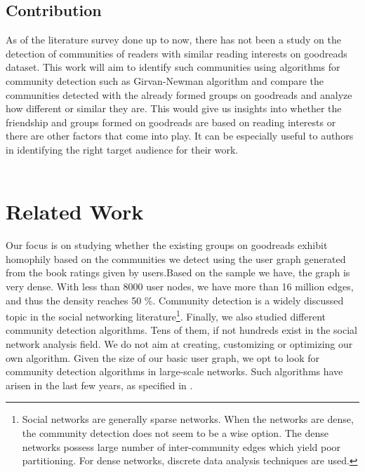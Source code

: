 \documentclass[11pt]{article}
\begin{document}
\subsection{Contribution}
As of the literature survey done up to now, there has not been a study on the detection of communities of readers with similar reading interests on goodreads dataset.
This work will aim to identify such communities using algorithms for community detection such as Girvan-Newman algorithm and compare the communities detected with the already formed groups on goodreads and analyze how different or similar they are.
This would give us insights into whether the friendship and groups formed on goodreads are based on reading interests or there are other factors that come into play. It can be especially useful to authors in identifying the right target audience for their work. \\\\

\section{Related Work}
\label{sec:related_work}
Our focus is on studying whether the existing groups on goodreads exhibit homophily based on the communities we detect using the user graph generated from the book ratings given by users.Based on the sample we have, the graph is very dense.
With less than 8000 user nodes, we have more than 16 million edges, and thus the density reaches 50 \%.
Community detection is a widely discussed topic in the social networking literature\footnote{Social networks are generally sparse networks. When the networks are dense, the community detection does not seem to be a wise option. The dense networks possess large number of inter-community edges which yield poor partitioning. For dense networks, discrete data analysis techniques are used.}\cite{clauset}.
Finally, we also studied different community detection algorithms. Tens of them, if not hundreds exist in the social network analysis field. We do not aim at creating, customizing or optimizing our own algorithm. Given the size of our basic user graph, we opt to look for community detection algorithms in large-scale networks. Such algorithms have arisen in the last few years, as specified in \cite{survey}.
\end{document}
